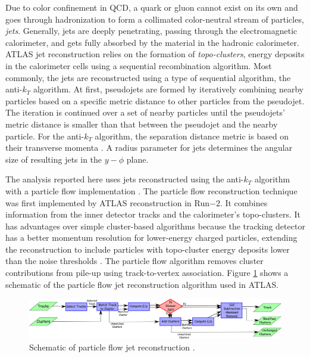 Due to color confinement in QCD, a quark or gluon cannot exist on its own and goes through hadronization to form a collimated color-neutral stream of particles, \textit{jets}. Generally, jets are deeply penetrating, passing through the electromagnetic calorimeter, and gets fully absorbed by the material in the hadronic calorimeter. ATLAS jet reconstruction relies on the formation of \textit{topo-clusters}, energy deposits in the calorimeter cells using a sequential recombination algorithm. Most commonly, the jets are reconstructed using a type of sequential algorithm, the anti-$k_{T}$ algorithm. At first, pseudojets are formed by iteratively combining nearby particles based on a specific metric distance to other particles from the pseudojet. The iteration is continued over a set of nearby particles until the pseudojets' metric distance is smaller than that between the pseudojet and the nearby particle. For the anti-$k_{T}$ algorithm, the separation distance metric is based on their transverse momenta \cite{AntiKtAlgo}. A radius parameter for jets determines the angular size of resulting jets in the $y-\phi$ plane. 

The analysis reported here uses jets reconstructed using the anti-$k_{T}$ algorithm with a particle flow implementation \cite{ParticleFlow}\cite{AntiKtAlgo}. The particle flow reconstruction technique was first implemented by ATLAS reconstruction in Run$-2$. It combines information from the inner detector tracks and the calorimeter's topo-clusters. It has advantages over simple cluster-based algorithms because the tracking detector has a better momentum resolution for lower-energy charged particles, extending the reconstruction to include particles with topo-cluster energy deposits lower than the noise thresholds \cite{ParticleFlow}. The particle flow algorithm removes cluster contributions from pile-up using track-to-vertex association. Figure \ref{fig:PflowJets} shows a schematic of the particle flow jet reconstruction algorithm used in ATLAS.

\begin{figure}[!htb]
    \centering
    \includegraphics[width=0.99\linewidth]{figures/LHC/fig_02.png}
    \caption{ Schematic of particle flow jet reconstruction \cite{ParticleFlow}.\label{fig:PflowJets}}
\end{figure}

